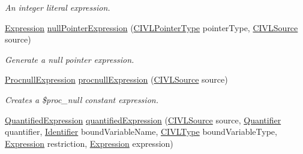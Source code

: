 \begin{DoxyCompactItemize}
\begin{DoxyCompactList}\small\item\em An integer literal expression. \end{DoxyCompactList}\item 
\hyperlink{interfaceedu_1_1udel_1_1cis_1_1vsl_1_1civl_1_1model_1_1IF_1_1expression_1_1Expression}{Expression} \hyperlink{interfaceedu_1_1udel_1_1cis_1_1vsl_1_1civl_1_1model_1_1IF_1_1ModelFactory_a0ca1360769b0963d44fe24c879cc5fff}{null\+Pointer\+Expression} (\hyperlink{interfaceedu_1_1udel_1_1cis_1_1vsl_1_1civl_1_1model_1_1IF_1_1type_1_1CIVLPointerType}{C\+I\+V\+L\+Pointer\+Type} pointer\+Type, \hyperlink{interfaceedu_1_1udel_1_1cis_1_1vsl_1_1civl_1_1model_1_1IF_1_1CIVLSource}{C\+I\+V\+L\+Source} source)
\begin{DoxyCompactList}\small\item\em Generate a null pointer expression. \end{DoxyCompactList}\item 
\hyperlink{interfaceedu_1_1udel_1_1cis_1_1vsl_1_1civl_1_1model_1_1IF_1_1expression_1_1ProcnullExpression}{Procnull\+Expression} \hyperlink{interfaceedu_1_1udel_1_1cis_1_1vsl_1_1civl_1_1model_1_1IF_1_1ModelFactory_a3e2fd862f2a1bf34ff4df3507b1094a3}{procnull\+Expression} (\hyperlink{interfaceedu_1_1udel_1_1cis_1_1vsl_1_1civl_1_1model_1_1IF_1_1CIVLSource}{C\+I\+V\+L\+Source} source)
\begin{DoxyCompactList}\small\item\em Creates a {\ttfamily \$proc\+\_\+null} constant expression. \end{DoxyCompactList}\item 
\hyperlink{interfaceedu_1_1udel_1_1cis_1_1vsl_1_1civl_1_1model_1_1IF_1_1expression_1_1QuantifiedExpression}{Quantified\+Expression} \hyperlink{interfaceedu_1_1udel_1_1cis_1_1vsl_1_1civl_1_1model_1_1IF_1_1ModelFactory_adcaf24e84f14b0f1139e90c48ea780a6}{quantified\+Expression} (\hyperlink{interfaceedu_1_1udel_1_1cis_1_1vsl_1_1civl_1_1model_1_1IF_1_1CIVLSource}{C\+I\+V\+L\+Source} source, \hyperlink{enumedu_1_1udel_1_1cis_1_1vsl_1_1civl_1_1model_1_1IF_1_1expression_1_1QuantifiedExpression_1_1Quantifier}{Quantifier} quantifier, \hyperlink{interfaceedu_1_1udel_1_1cis_1_1vsl_1_1civl_1_1model_1_1IF_1_1Identifier}{Identifier} bound\+Variable\+Name, \hyperlink{interfaceedu_1_1udel_1_1cis_1_1vsl_1_1civl_1_1model_1_1IF_1_1type_1_1CIVLType}{C\+I\+V\+L\+Type} bound\+Variable\+Type, \hyperlink{interfaceedu_1_1udel_1_1cis_1_1vsl_1_1civl_1_1model_1_1IF_1_1expression_1_1Expression}{Expression} restriction, \hyperlink{interfaceedu_1_1udel_1_1cis_1_1vsl_1_1civl_1_1model_1_1IF_1_1expression_1_1Expression}{Expression} expression)

\end{DoxyCompactItemize}
